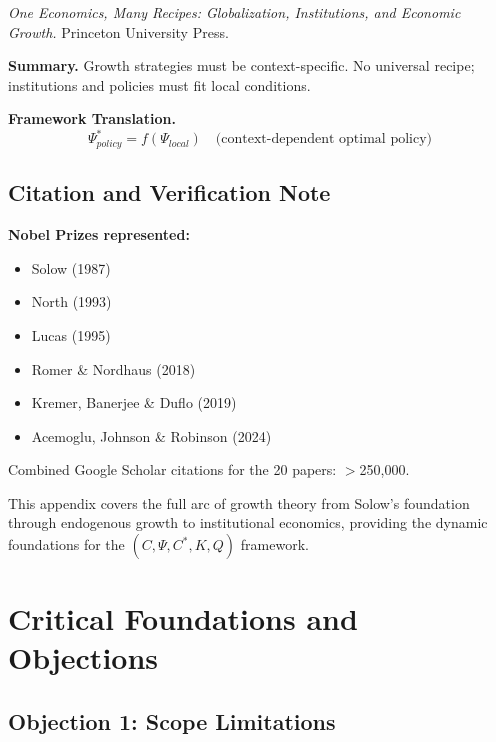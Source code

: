 \textit{One Economics, Many Recipes: Globalization, Institutions, and Economic Growth.}
Princeton University Press.

\textbf{Summary.}
Growth strategies must be context-specific. No universal recipe; 
institutions and policies must fit local conditions.

\textbf{Framework Translation.}
\begin{equation}
\Psi^*_{policy} = f(\Psi_{local}) \quad \text{(context-dependent optimal policy)}
\end{equation}

\subsection{Citation and Verification Note}

\textbf{Nobel Prizes represented:}
\begin{itemize}
    \item Solow (1987)
    \item North (1993)
    \item Lucas (1995)
    \item Romer \& Nordhaus (2018)
    \item Kremer, Banerjee \& Duflo (2019)
    \item Acemoglu, Johnson \& Robinson (2024)
\end{itemize}

Combined Google Scholar citations for the 20 papers: $>$250,000.

This appendix covers the full arc of growth theory from Solow's foundation 
through endogenous growth to institutional economics, providing the dynamic 
foundations for the $(C, \Psi, C^*, K, Q)$ framework.




\section{Critical Foundations and Objections}
\label{sec:grw-foundations}

\subsection{Objection 1: Scope Limitations}

